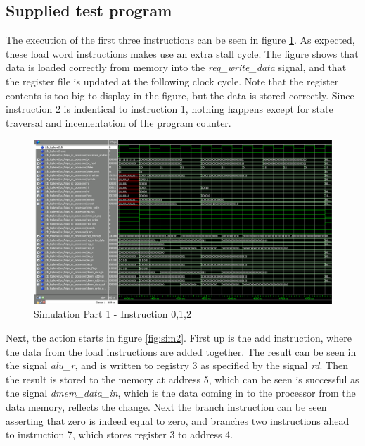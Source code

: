 \subsection{Supplied test program}
The execution of the first three instructions can be seen in figure \ref{fig:sim1}. As expected, these load word instructions makes use an extra stall cycle. The figure shows that data is loaded correctly from memory into the \emph{reg_write_data} signal, and that the register file is updated at the following clock cycle. Note that the register contents is too big to display in the figure, but the data is stored correctly. Since instruction 2 is indentical to instruction 1, nothing happens except for state traversal and incementation of the program counter.
\begin{figure}[ht]
    \centering
    \includegraphics[scale=0.3]{figures/sim1.png}
    \caption{\label{fig:sim1}Simulation Part 1 - Instruction 0,1,2}
\end{figure}

Next, the action starts in figure \ref{fig:sim2}. First up is the add instruction, where the data from the load instructions are added together. The result can be seen in the signal \emph{alu_r}, and is written to registry 3 as specified by the signal \emph{rd}. Then the result is stored to the memory at address 5, which can be seen is successful as the signal \emph{dmem_data_in}, which is the data coming in to the processor from the data memory, reflects the change. Next the branch instruction can be seen asserting that zero is indeed equal to zero, and branches two instructions ahead to instruction 7, which stores register 3 to address 4.


